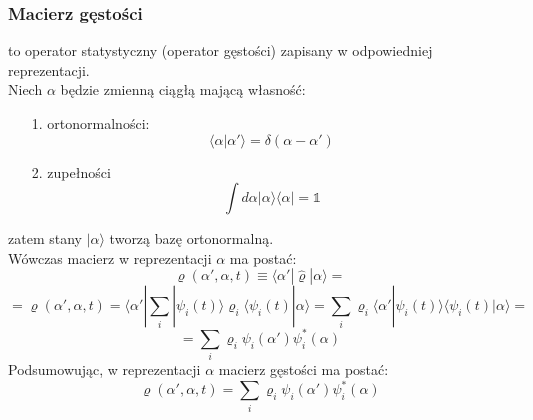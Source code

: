 \subsubsection{Macierz gęstości} to operator statystyczny (operator gęstości) zapisany w odpowiedniej reprezentacji.\\
Niech $\alpha$ będzie zmienną ciągłą mającą własność:
\begin{itemize}
\item[1.] ortonormalności:
\begin{equation}\langle\alpha|\alpha'\rangle=\delta (\alpha-\alpha')\end{equation}
\item[2.] zupełności
\begin{equation}\int d\alpha|\alpha\rangle\langle\alpha|=\mathds{1}
\end{equation}
\end{itemize}
zatem stany $|\alpha\rangle$ tworzą bazę ortonormalną.\\
Wówczas macierz w reprezentacji $\alpha$ ma postać:
\begin{equation}\varrho(\alpha',\alpha,t)\equiv\langle\alpha'|\hat{\varrho}|\alpha\rangle=
\nonumber\end{equation}
\begin{equation}=\varrho(\alpha',\alpha,t)=
\langle\alpha'|{\scriptstyle{\sum_i}}|\psi_i(t)\rangle\varrho_i\langle\psi_i(t)|\alpha\rangle=\sum_i\varrho_i\langle\alpha'|\psi_i(t)\rangle\langle\psi_i(t)|\alpha\rangle=\nonumber\end{equation}
\begin{equation}
=\sum_i\varrho_i\psi_i(\alpha')\psi_i^*(\alpha)
\end{equation}
Podsumowując, w reprezentacji $\alpha$ macierz gęstości ma postać:
\begin{equation}\varrho(\alpha',\alpha,t)=\sum_i\varrho_i\psi_i(\alpha')\psi_i^*(\alpha)
\end{equation}
